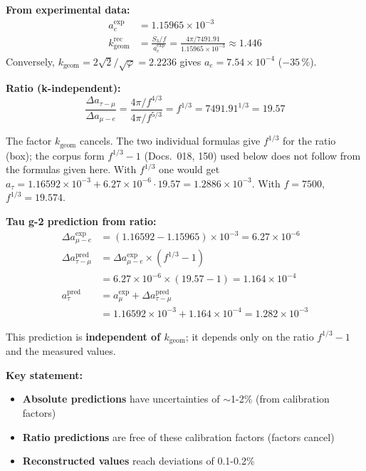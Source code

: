 	\textbf{From experimental data:}
	\begin{align}
		a_e^{\exp} &= 1.15965 \times 10^{-3} \\
		k_{\text{geom}}^{\text{rec}} &= \frac{S_3/f}{a_e^{\exp}} = \frac{4\pi/7491.91}{1.15965 \times 10^{-3}} \approx 1.446
	\end{align}
	Conversely, $k_\text{geom} = 2\sqrt{2}/\sqrt{\varphi} = 2.2236$ gives $a_e = 7.54\times10^{-4}$ ($-35\,\%$).
	
	\textbf{Ratio (k-independent):}
	\begin{equation}
		\boxed{\frac{\Delta a_{\tau-\mu}}{\Delta a_{\mu-e}} = \frac{4\pi/f^{4/3}}{4\pi/f^{5/3}} = f^{1/3} = 7491.91^{1/3} = 19.57}
	\end{equation}
	
	The factor \(k_{\text{geom}}\) cancels.
	The two individual formulas give $f^{1/3}$ for the ratio (box); the corpus form $f^{1/3}-1$ (Docs.~018, 150) used below does not follow from the formulas given here. With $f^{1/3}$ one would get $a_\tau = 1.16592\times10^{-3} + 6.27\times10^{-6}\cdot19.57 = 1.2886\times10^{-3}$. With $f = 7500$, $f^{1/3} = 19.574$.
	
	\textbf{Tau g-2 prediction from ratio:}
	\begin{align}
		\Delta a_{\mu-e}^{\exp} &= (1.16592 - 1.15965) \times 10^{-3} = 6.27 \times 10^{-6} \\
		\Delta a_{\tau-\mu}^{\text{pred}} &= \Delta a_{\mu-e}^{\exp} \times (f^{1/3} - 1) \\
		&= 6.27 \times 10^{-6} \times (19.57 - 1) = 1.164 \times 10^{-4} \\
		a_\tau^{\text{pred}} &= a_\mu^{\exp} + \Delta a_{\tau-\mu}^{\text{pred}} \\
		&= 1.16592 \times 10^{-3} + 1.164 \times 10^{-4} = 1.282 \times 10^{-3}
	\end{align}
	
	This prediction is \textbf{independent of \(k_{\text{geom}}\)}; it depends only on the ratio \(f^{1/3}-1\) and the measured values.
	
	\textbf{Key statement:}
	
	\begin{itemize}
		\item \textbf{Absolute predictions} have uncertainties of \(\sim\)1-2\% (from calibration factors)
		\item \textbf{Ratio predictions} are free of these calibration factors (factors cancel)
		\item \textbf{Reconstructed values} reach deviations of 0.1-0.2\%
	\end{itemize}
	
